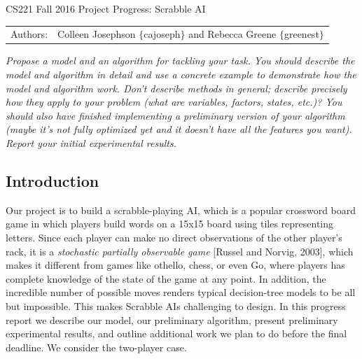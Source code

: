 \documentclass[12pt]{article}
\begin{document}
\begin{center}
{\Large CS221 Fall 2016 Project Progress: Scrabble AI}

\begin{tabular}{rl}
  Authors: & Colleen Josephson $\{$cajoseph$\}$ and Rebecca Greene $\{$greenest$\}$\\
\end{tabular}
\end{center}

\emph{Propose a model and an algorithm for tackling your task. You should
describe the model and algorithm in detail and use a concrete example
to demonstrate how the model and algorithm work. Don't describe
methods in general; describe precisely how they apply to your problem
(what are variables, factors, states, etc.)? You should also have
finished implementing a preliminary version of your algorithm (maybe
it's not fully optimized yet and it doesn't have all the features you
want). Report your initial experimental results.}


\subsection{Introduction}
Our project is to build a scrabble-playing AI, which is a popular
crossword board game in which players build words on a 15x15 board
using tiles representing letters. Since each player can make no direct
observations of the other player's rack, it is a \emph{stochastic
  partially observable game} [Russel and Norvig, 2003], which makes it
different from games like othello, chess, or even Go, where players
has complete knowledge of the state of the game at any point. In
addition, the incredible number of possible moves renders typical
decision-tree models to be all but impossible. This makes Scrabble AIs
challenging to design. In this progress report we describe our model,
our preliminary algorithm, present preliminary experimental results,
and outline additional work we plan to do before the final
deadline. We consider the two-player case.
\end{document}
